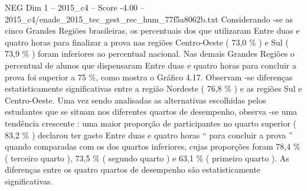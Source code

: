 \begin{textsample}{NEG Dim 1 – 2015\_c4 – Score -4.00 – 2015\_c4/enade\_2015\_tec\_gest\_rec\_hum\_77f5a8062b.txt}
Considerando -se as cinco Grandes Regiões brasileiras, os percentuais dos que utilizaram Entre duas e quatro horas para finalizar a prova nas regiões Centro-Oeste ( 73,0 \% ) e Sul ( 73,9 \% ) foram inferiores ao percentual nacional.
Nas demais Grandes Regiões o percentual de alunos que dispensaram Entre duas e quatro horas para concluir a prova foi superior a 75 \%, como mostra o Gráfico 4.17.
Observam -se diferenças estatisticamente significativas entre a região Nordeste ( 76,8 \% ) e as regiões Sul e Centro-Oeste.
Uma vez sendo analisadas as alternativas escolhidas pelos estudantes que se situam nos diferentes quartos de desempenho, observa -se uma tendência crescente : uma maior proporção de participantes no quarto superior ( 83,2 \% ) declarou ter gasto Entre duas e quatro horas “ para concluir a prova ” quando comparadas com os dos quartos inferiores, cujas proporções foram 78,4 \% ( terceiro quarto ), 73,5 \% ( segundo quarto ) e 63,1 \% ( primeiro quarto ).
As diferenças entre os quatro quartos de desempenho são estatisticamente significativas.

\end{textsample}
